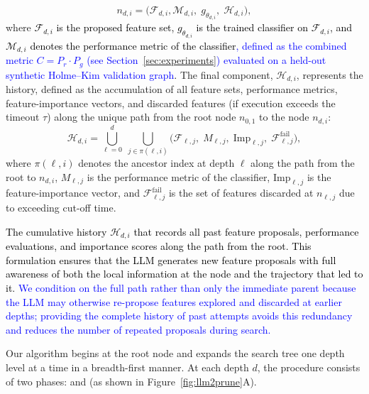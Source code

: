 \[
n_{d,i} = \big(\mathcal{F}_{d,i},\mathcal{M}_{d,i}, \; g_{\theta_{d,i}}, \; \mathcal{H}_{d,i}\big),
\]
where \textcolor{black}{$\mathcal{F}_{d,i}$ is the proposed feature set, $g_{\theta_{d,i}}$ is the trained classifier on $\mathcal{F}_{d,i}$, and $\mathcal{M}_{d,i}$ denotes the performance metric of the classifier\textcolor{blue}{, defined as the combined metric $C = P_r \cdot P_g$ (see Section~\ref{sec:experiments}) evaluated on a held-out synthetic Holme--Kim validation graph}.} The final component, $\mathcal{H}_{d,i}$, represents the history, defined as the accumulation of all feature sets, performance metrics, feature-importance vectors, and discarded features (if execution exceeds the timeout $\tau$) along the unique path from the root node $n_{0,1}$ to the node $n_{d,i}$:
\[
\mathcal{H}_{d,i} = \bigcup_{\ell=0}^{d} \; \bigcup_{j \in \pi(\ell,i)} 
\Big( \mathcal{F}_{\ell,j}, \; M_{\ell,j}, \; \text{Imp}_{\ell,j}, \; \mathcal{F}^{\text{fail}}_{\ell,j} \Big),
\]
where $\pi(\ell,i)$ denotes the ancestor index at depth $\ell$ along the path from the root to $n_{d,i}$, 
$M_{\ell,j}$ is the performance metric of the classifier, 
$\text{Imp}_{\ell,j}$ is the feature-importance vector, 
and $\mathcal{F}^{\text{fail}}_{\ell,j}$ is the set of features discarded at $n_{\ell,j}$ due to exceeding cut-off time.




\textcolor{black}{The cumulative history $\mathcal{H}_{d,i}$ that records all past feature proposals, performance evaluations, and importance scores along the path from the root. This formulation ensures that the LLM generates new feature proposals with full awareness of both the local information at the node and the trajectory that led to it.} \textcolor{blue}{We condition on the full path rather than only the immediate parent because the LLM may otherwise re-propose features explored and discarded at earlier depths; providing the complete history of past attempts avoids this redundancy and reduces the number of repeated proposals during search.}







Our algorithm begins at the root node and expands the search tree one depth level at a time in a breadth-first manner. At each depth $d$, the procedure consists of two phases:  and  (as shown in Figure~\ref{fig:llm2prune}A).  



